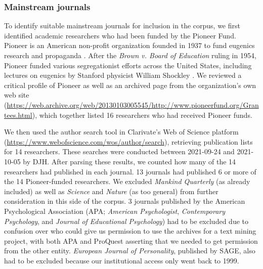 \documentclass[12pt]{article}
\begin{document}
\hypertarget{mainstream-journals}{%
\subsubsection{Mainstream journals}\label{mainstream-journals}}

To identify suitable mainstream journals for inclusion in the corpus, we first identified academic researchers who had been funded by the Pioneer Fund. Pioneer is an American non-profit organization founded in 1937 to fund eugenics research and propaganda \cite{TuckerFundingScientificRacism2002}. After the \emph{Brown v. Board of Education} ruling in 1954, Pioneer funded various segregationist efforts across the United States, including lectures on eugenics by Stanford physicist William Shockley \cite{JacksonScienceSegregationRace2005}. We reviewed a critical profile of Pioneer \cite{MillerPioneerFundBankrolling1994} as well as an archived page from the organization's own web site (\url{https://web.archive.org/web/20130103005545/http://www.pioneerfund.org/Grantees.html}), which together listed 16 researchers who had received Pioneer funds.

We then used the author search tool in Clarivate's Web of Science platform (\url{https://www.webofscience.com/wos/author/search}), retrieving publication lists for 14 researchers. These searches were conducted between 2021-09-24 and 2021-10-05 by DJH. After parsing these results, we counted how many of the 14 researchers had published in each journal. 13 journals had published 6 or more of the 14 Pioneer-funded researchers. We excluded \emph{Mankind Quarterly} (as already included) as well as \emph{Science} and \emph{Nature} (as too general) from further consideration in this side of the corpus. 3 journals published by the American Psychological Association (APA; \emph{American Psychologist}, \emph{Contemporary Psychology}, and \emph{Journal of Educational Psychology}) had to be excluded due to confusion over who could give us permission to use the archives for a text mining project, with both APA and ProQuest asserting that we needed to get permission from the other entity. \emph{European Journal of Personality}, published by SAGE, also had to be excluded because our institutional access only went back to 1999.
\end{document}

